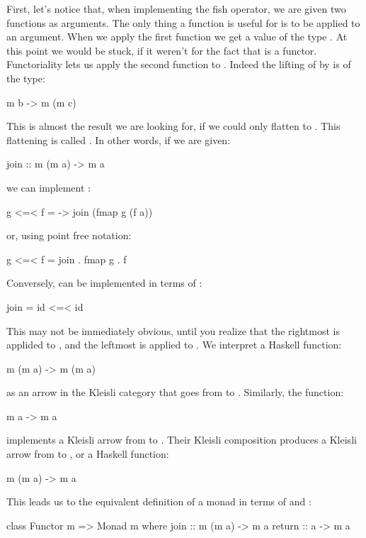 \documentclass[DaoFP]{subfiles}
\begin{document}
First, let's notice that, when implementing the fish operator, we are given two functions as arguments. The only thing a function is useful for is to be applied to an argument. When we apply the first function  we get a value of the type . At this point we would be stuck, if it weren't for the fact that  is a functor. Functoriality lets us apply the second function  to . Indeed the lifting of  by  is of the type:
\begin{haskell}
m b -> m (m c)
\end{haskell}
This is almost the result we are looking for, if we could only flatten  to . This flattening is called . In other words, if we are given:
\begin{haskell}
join ::  m (m a) -> m a
\end{haskell}
we can implement \hask{<=<}:
\begin{haskell}
g <=< f = \a -> join (fmap g (f a))
\end{haskell}
or, using point free notation:
\begin{haskell}
g <=< f = join . fmap g . f
\end{haskell}

Conversely,  can be implemented in terms of \hask{<=<}:
\begin{haskell}
join = id <=< id
\end{haskell}
This may not be immediately obvious, until you realize that the rightmost  is applided to , and the leftmost is applied to . We interpret a Haskell function:
\begin{haskell}
m (m a) -> m (m a)
\end{haskell}
as an arrow in the Kleisli category that goes from  to . Similarly, the function:
\begin{haskell}
m a -> m a
\end{haskell}
implements a Kleisli arrow from  to . Their Kleisli composition produces a Kleisli arrow from  to , or a Haskell function:
\begin{haskell}
m (m a) -> m a
\end{haskell}

This leads us to the equivalent definition of a monad in terms of  and :
\begin{haskell}
class Functor m => Monad m where
  join :: m (m a) -> m a
  return :: a -> m a
\end{haskell}
\end{document}
